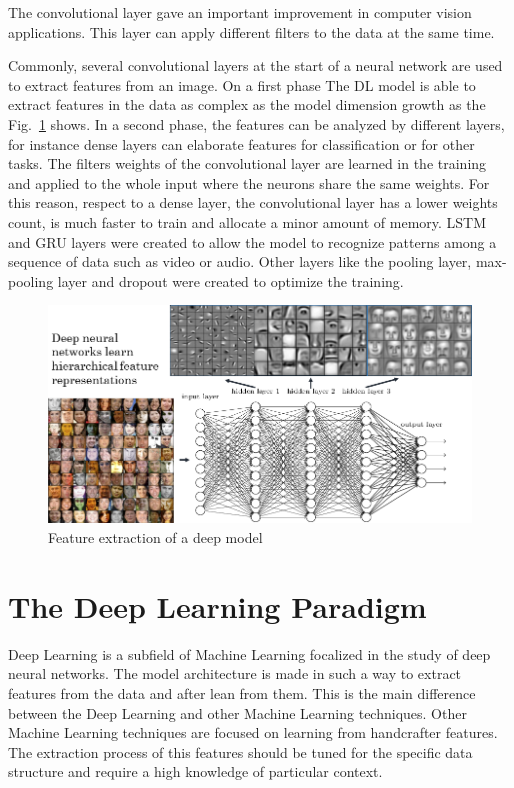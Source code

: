 \documentclass[12pt]{report}
\begin{document}
The convolutional layer gave an important improvement in computer vision applications. This layer can apply different filters to the data at the same time.

Commonly, several convolutional layers at the start of a neural network are used to extract features from an image. 
On a first phase The DL model is able to extract features in the data as complex as the model dimension growth as the Fig.~\ref{fig:featuresextract} shows.
In a second phase, the features can be analyzed by different layers, for instance dense layers can elaborate features for classification or for other tasks.
The filters weights of the convolutional layer are learned in the training and applied to the whole input where the neurons share the same weights. 
For this reason, respect to a dense layer, the convolutional layer has a lower weights count,  is much faster to train and allocate a minor amount of memory.
LSTM and GRU layers were created to allow the model to recognize patterns among a sequence of data such as video or audio.
Other layers like the pooling layer, max-pooling layer and dropout were created to optimize the training.


\begin{figure}[t]
    \centering
    \includegraphics[scale=.5]{layers-features.png}
    \caption{Feature extraction of a deep model \cite{featuresextract}}
    \label{fig:featuresextract}
\end{figure}


\section{The Deep Learning Paradigm}

Deep Learning is a subfield of Machine Learning focalized in the study of deep neural networks.
The model architecture is made in such a way to extract features from the data and after lean from them.
This is the main difference between the Deep Learning and other Machine Learning techniques.
Other Machine Learning techniques are focused on learning from handcrafter features.
The extraction process of this features should be tuned for the specific data structure and 
require a high knowledge of particular context.
\end{document}
